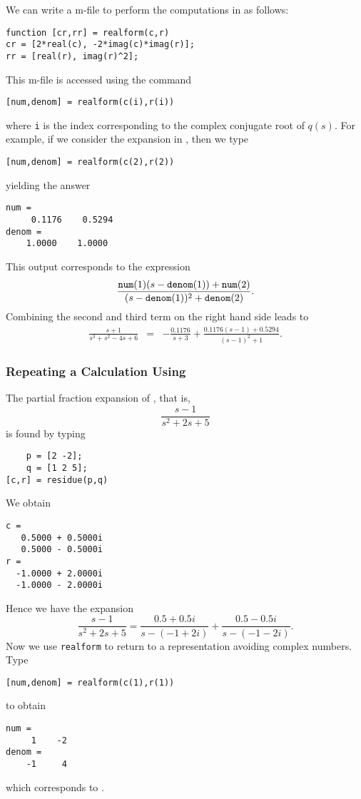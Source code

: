 We can write a \Matlab m-file to perform the computations in 
as follows:
\begin{verbatim}
function [cr,rr] = realform(c,r)
cr = [2*real(c), -2*imag(c)*imag(r)];
rr = [real(r), imag(r)^2];
\end{verbatim}
This m-file is accessed using the command 
\begin{verbatim}
[num,denom] = realform(c(i),r(i))
\end{verbatim}
where {\tt i} is the index corresponding to the complex conjugate root of 
$q(s)$.  For example, if we consider the expansion in , then we 
type 
\begin{verbatim}
[num,denom] = realform(c(2),r(2))
\end{verbatim}
yielding the answer
\begin{verbatim}
num =
     0.1176    0.5294
denom = 
    1.0000    1.0000
\end{verbatim}
This output corresponds to the expression
\[
\frac{{\tt num}(1)(s-{\tt denom}(1)) + {\tt num}(2)}{(s-{\tt denom}(1))^2 + 
{\tt denom}(2)}.
\]
Combining the second and third term on the right hand side leads to
\begin{eqnarray*}
\frac{s+1}{s^3+s^2-4s+6} & = & 
-\frac{0.1176}{s+3} + \frac{0.1176(s-1)+0.5294}{(s-1)^2+1}.
\end{eqnarray*}

\subsubsection*{Repeating a Calculation Using \Matlab}

The partial fraction expansion of , that is,
\[
\frac{s-1}{s^2+2s+5}
\]
is found by typing
\begin{verbatim}
    p = [2 -2];
    q = [1 2 5];
[c,r] = residue(p,q)
\end{verbatim}
We obtain
\begin{verbatim}
c =
   0.5000 + 0.5000i
   0.5000 - 0.5000i
r =
  -1.0000 + 2.0000i
  -1.0000 - 2.0000i
\end{verbatim}
Hence we have the expansion
\[
\frac{s-1}{s^2+2s+5}= \frac{0.5+0.5i}{s-(-1+2i)}+\frac{0.5-0.5i}{s-(-1-2i)}.
\]
Now we use {\tt realform} 
to return to a representation avoiding complex numbers.  Type
\begin{verbatim}
[num,denom] = realform(c(1),r(1))
\end{verbatim}
to obtain
\begin{verbatim}
num = 
     1    -2
denom = 
    -1     4
\end{verbatim}
which corresponds to .

